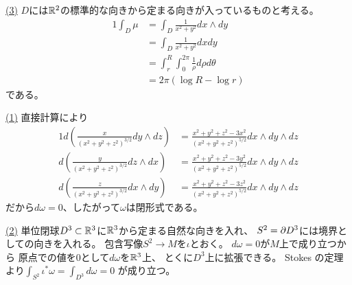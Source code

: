 \documentclass[report, notitlepage]{jlreq}
\begin{document}
\begin{answer}
    \uline{(3)} \quad
    $D$には$\mathbb{R}^2$の標準的な向きから定まる向きが入っているものと考える。
    \begin{alignat}{1}
        \int_D \mu
            &= \int_D \frac{1}{x^2 + y^2} dx \wedge dy \\
            &= \int_D \frac{1}{x^2 + y^2} dx dy \\
            &= \int_r^R \int_0^{2\pi} \frac{1}{\rho} d\rho d\theta \\
            &= 2 \pi (\log R - \log r)
    \end{alignat}
    である。
\end{answer}

\begin{problem}[問3]
\end{problem}

\begin{answer}
    \uline{(1)} \quad
    直接計算により
    \begin{alignat}{1}
        d\left(
            \frac{x}{(x^2 + y^2 + z^2)^{3/2}} dy \wedge dz
        \right)
            &= \frac{x^2 + y^2 + z^2 - 3x^2}{(x^2 + y^2 + z^2)^{5/2}}
                dx \wedge dy \wedge dz \\
        d\left(
            \frac{y}{(x^2 + y^2 + z^2)^{3/2}} dz \wedge dx
        \right)
            &= \frac{x^2 + y^2 + z^2 - 3y^2}{(x^2 + y^2 + z^2)^{5/2}}
                dx \wedge dy \wedge dz \\
        d\left(
            \frac{z}{(x^2 + y^2 + z^2)^{3/2}} dx \wedge dy
        \right)
            &= \frac{x^2 + y^2 + z^2 - 3z^2}{(x^2 + y^2 + z^2)^{5/2}}
                dx \wedge dy \wedge dz
    \end{alignat}
    だから$d\omega = 0$、したがって$\omega$は閉形式である。

    \uline{(2)} \quad
    単位閉球$D^3 \subset \mathbb{R}^3$に$\mathbb{R}^3$から定まる自然な向きを入れ、
    $S^2 = \partial D^3$には境界としての向きを入れる。
    包含写像$S^2 \to M$を$\iota$とおく。
    $d\omega = 0$が$M$上で成り立つから
    原点での値を$0$として$d\omega$を$\mathbb{R}^3$上、
    とくに$D^3$上に拡張できる。
    Stokes の定理より$\int_{S^2} \iota^* \omega = \int_{D^3} d\omega = 0$
    が成り立つ。


\end{answer}
\end{document}
